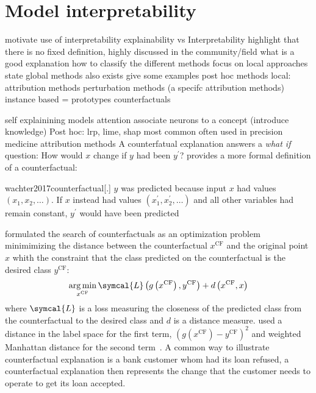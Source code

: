 \documentclass[../main.tex]{subfiles}
\begin{document}
\section{Model interpretability}
	motivate use of interpretability
	explainability vs Interpretability
	highlight that there is no fixed definition, highly discussed in the community/field
	what is a good explanation
	how to classify the different methods 
	focus on local approaches state global methods also exists give some examples
	post hoc methods local: 
	attribution methods 
	perturbation methods (a specifc attribution methods)
	instance based = prototypes 
	counterfactuals

	self explainining models 
	attention  
	associate neurons to a concept (introduce knowledge)
	Post hoc: lrp, lime, shap most common often used in precision medicine 
	attribution methods 
	A counterfatual explanation answers a \textit{what if} question: How would \(x\) change if \(y\) had been \(y^{\prime}\)?
	\citeauthor{wachter2017counterfactual} provides a more formal definition of a counterfactual: 
	\begin{displaycquote}{wachter2017counterfactual}[.]
		\(y\) was predicted because input \(x\) had values \(\left(x_{1}, x_{2}, \ldots\right)\). If \(x\) instead had values \(\left(x_{1}^{\prime}, x_{2}^{\prime}, \ldots\right)\) and all other variables had remain constant, \(y^{\prime}\) would have been predicted
	\end{displaycquote}
	\citeauthor{wachter2017counterfactual} formulated the search of counterfactuals as an optimization problem minimimizing the distance between the counterfactual \(x^{\text{CF}}\) and the original point \(x\) whith the constraint that the class predicted on the counterfactual is the desired class \(y^{\text{CF}}\):
	\begin{equation}
		\argmin_{x^{\text{CF}}} \symcal{L}\left(g\left(x^{\text{CF}}\right), y^{\text{CF}} \right) + d\left(x^{\text{CF}}, x\right)\label{eq:opt_cf}
	\end{equation}
	where \(\symcal{L}\) is a loss measuring the closeness of the predicted class from the counterfactual to the desired class and \(d\) is a distance measure. 
	\citeauthor{wachter2017counterfactual} used a distance in the label space for the first term, \({\left(g\left(x^{\text{CF}}\right) - y^{\text{CF}}\right)}^{2}\) and weighted Manhattan distance for the second term~\cite{wachter2017counterfactual}.
	A common way to illustrate counterfactual explanation is a bank customer whom had its loan refused, a counterfactual explanation then represents the change that the customer needs to operate to get its loan accepted. 
\end{document}

